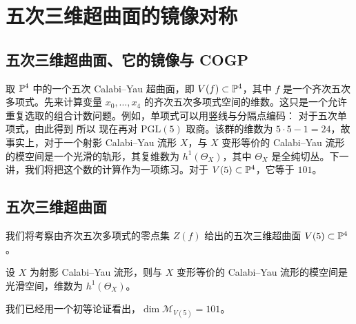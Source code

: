 \chapter{五次三维超曲面的镜像对称}
\section{五次三维超曲面、它的镜像与 COGP}
取 $\mathbb P^4$ 中的一个五次 Calabi–Yau 超曲面，即 $V(f)\subset\mathbb P^4$，其中 $f$ 是一个齐次五次多项式。先来计算变量 $x_0,\ldots,x_4$ 的齐次五次多项式空间的维数。这只是一个允许重复选取的组合计数问题。例如，单项式可以用竖线与分隔点编码：
对于五次单项式，由此得到
所以
现在再对 $\mathrm{PGL}(5)$ 取商。该群的维数为 $5\cdot5-1=24$，故
事实上，对于一个射影 Calabi–Yau 流形 $X$，与 $X$ 变形等价的 Calabi–Yau 流形的模空间是一个光滑的轨形，其复维数为 $h^1(\Theta_X)$，其中 $\Theta_X$ 是全纯切丛。下一讲，我们将把这个数的计算作为一项练习。对于 $V(5)\subset\mathbb P^4$，它等于 $101$。
\section{五次三维超曲面}
我们将考察由齐次五次多项式的零点集 $Z(f)$ 给出的五次三维超曲面 $V(5)\subset\mathbb P^4$。
\begin{theorem}\label{thm:1.1}
设 $X$ 为射影 Calabi–Yau 流形，则与 $X$ 变形等价的 Calabi–Yau 流形的模空间是光滑空间，维数为 $h^1(\Theta_X)$。
\end{theorem}
我们已经用一个初等论证看出，$\dim\mathcal M_{V(5)}=101$。
